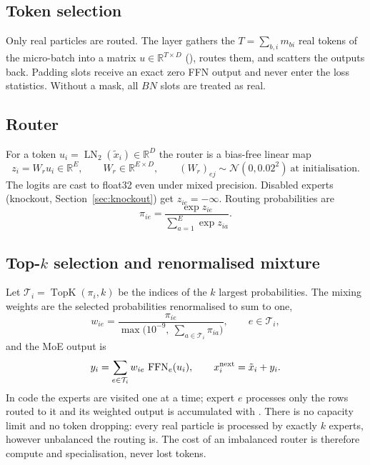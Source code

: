 \documentclass[11pt,a4paper]{article}
\newcommand{\code}[1]{\texttt{\detokenize{#1}}}
\newcommand{\R}{\mathbb R}
\newcommand{\LN}{\operatorname{LN}}
\newcommand{\FFN}{\operatorname{FFN}}
\newcommand{\TopK}{\operatorname{TopK}}
\begin{document}
\subsection{Token selection}
Only real particles are routed. The layer gathers the $T=\sum_{b,i}m_{bi}$ real tokens of the
micro-batch into a matrix $u\in\R^{T\times D}$ (\code{x[mask]}), routes them, and scatters the
outputs back. Padding slots receive an exact zero FFN output and never enter the loss
statistics. Without a mask, all $B N$ slots are treated as real.

\subsection{Router}
For a token $u_i=\LN_2(\tilde x_i)\in\R^{D}$ the router is a bias-free linear map
\begin{equation}
 z_i=W_r u_i\in\R^{E},\qquad W_r\in\R^{E\times D},\qquad (W_r)_{ej}\sim\mathcal N(0,0.02^2)
 \ \text{at initialisation}.
\end{equation}
The logits are cast to float32 even under mixed precision. Disabled experts (knockout,
Section~\ref{sec:knockout}) get $z_{ie}=-\infty$. Routing probabilities are
\begin{equation}
 \pi_{ie}=\frac{\exp z_{ie}}{\sum_{a=1}^{E}\exp z_{ia}}.
\end{equation}

\subsection{Top-$k$ selection and renormalised mixture}
Let $\mathcal T_i=\TopK(\pi_i,k)$ be the indices of the $k$ largest probabilities. The mixing
weights are the selected probabilities renormalised to sum to one,
\begin{equation}
 w_{ie}=\frac{\pi_{ie}}{\max\big(10^{-9},\ \sum_{a\in\mathcal T_i}\pi_{ia}\big)},
 \qquad e\in\mathcal T_i,
\end{equation}
and the MoE output is
\begin{equation}
 y_i=\sum_{e\in\mathcal T_i}w_{ie}\,\FFN_e(u_i),\qquad
 x_i^{\rm next}=\tilde x_i+y_i.
\end{equation}
In code the experts are visited one at a time; expert $e$ processes only the rows routed to
it and its weighted output is accumulated with \code{index_add_}. There is no capacity limit
and no token dropping: every real particle is processed by exactly $k$ experts, however
unbalanced the routing is. The cost of an imbalanced router is therefore compute and
specialisation, never lost tokens.
\end{document}
